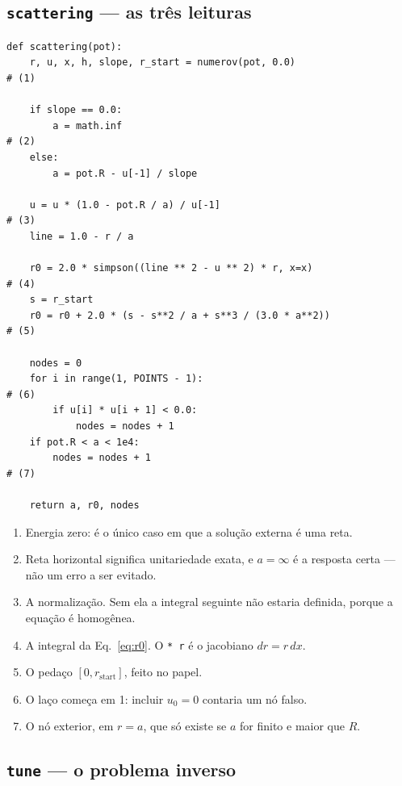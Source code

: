 \documentclass[11pt,a4paper]{article}
\begin{document}
\subsection{\texttt{scattering} --- as três leituras}

\begin{lstlisting}
def scattering(pot):
    r, u, x, h, slope, r_start = numerov(pot, 0.0)                    # (1)

    if slope == 0.0:
        a = math.inf                                                  # (2)
    else:
        a = pot.R - u[-1] / slope

    u = u * (1.0 - pot.R / a) / u[-1]                                 # (3)
    line = 1.0 - r / a

    r0 = 2.0 * simpson((line ** 2 - u ** 2) * r, x=x)                 # (4)
    s = r_start
    r0 = r0 + 2.0 * (s - s**2 / a + s**3 / (3.0 * a**2))              # (5)

    nodes = 0
    for i in range(1, POINTS - 1):                                    # (6)
        if u[i] * u[i + 1] < 0.0:
            nodes = nodes + 1
    if pot.R < a < 1e4:
        nodes = nodes + 1                                             # (7)

    return a, r0, nodes
\end{lstlisting}

\begin{enumerate}\setlength\itemsep{1pt}
\item Energia zero: é o único caso em que a solução externa é uma reta.
\item Reta horizontal significa unitariedade exata, e $a=\infty$ é a resposta
      certa --- não um erro a ser evitado.
\item A normalização. Sem ela a integral seguinte não estaria definida, porque
      a equação é homogênea.
\item A integral da Eq.~\eqref{eq:r0}. O \texttt{* r} é o jacobiano $dr = r\,dx$.
\item O pedaço $[0, r_{\text{start}}]$, feito no papel.
\item O laço começa em 1: incluir $u_0=0$ contaria um nó falso.
\item O nó exterior, em $r=a$, que só existe se $a$ for finito e maior que $R$.
\end{enumerate}

\subsection{\texttt{tune} --- o problema inverso}
\end{document}
